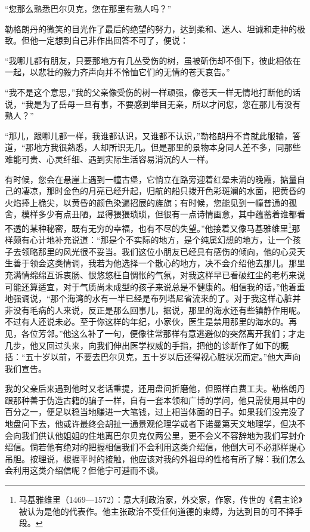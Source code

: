 \par “您那么熟悉巴尔贝克，您在那里有熟人吗？”
\par 勒格朗丹的微笑的目光作了最后的绝望的努力，达到柔和、迷人、坦诚和走神的极致。但他一定想到自己非作出回答不可了，便说：
\par “我哪儿都有朋友，只要那地方有几丛受伤的树，虽被斫伤却不倒下，彼此相依在一起，以悲壮的毅力齐声向并不怜恤它们的无情的苍天哀告。”
\par “我不是这个意思，”我的父亲像受伤的树一样顽强，像苍天一样无情地打断他的话说，“我是为了岳母一旦有事，不要感到举目无亲，所以才问您，您在那儿有没有熟人？”
\par “那儿，跟哪儿都一样，我谁都认识，又谁都不认识，”勒格朗丹不肯就此服输，答道，“那地方我很熟悉，人却所识无几。但是那里的景物本身同人差不多，同那些难能可贵、心灵纤细、遇到实际生活容易消沉的人一样。
\par 有时候，您会在悬崖上遇到一幢古堡，它悄立在路旁迎着红晕未消的晚霞，掂量自己的凄凉，那时金色的月亮已经升起，归航的船只拨开色彩斑斓的水面，把黄昏的火焰捧上桅尖，以黄昏的颜色染遍招展的旌旗；有时候，您能见到一幢普通的孤舍，模样多少有点丑陋，显得猥猥琐琐，但很有一点诗情画意，其中蕴蓄着谁都看不透的某种秘密，既有无穷的幸福，也有不尽的失望。”他接着又像马基雅维里\footnote{马基雅维里（1469—1572）：意大利政治家，外交家，作家，传世的《君主论》被认为是他的代表作。他主张政治不受任何道德的束缚，为达到目的可不择手段。}那样颇有心计地补充说道：“那是个不实际的地方，是个纯属幻想的地方，让一个孩子去领略那里的风光很不妥当。我们这位小朋友已经具有感伤的倾向，他的心灵天生善于领会这类情调，我若为他选择一个散心的地方，决不会介绍他去那儿。那里充满情绵绵互诉衷肠、恨悠悠枉自惆怅的气氛，对我这样早已看破红尘的老朽来说可能还算适宜，对于气质尚未成型的孩子来说总是不健康的。相信我的话，”他着重地强调说，“那个海湾的水有一半已经是布列塔尼省流来的了。对于我这样心脏并非没有毛病的人来说，反正是那么回事儿，据说，那里的海水还有些镇静作用呢。不过有人还说未必。至于你这样的年纪，小家伙，医生是禁用那里的海水的。再见，各位芳邻。”他这么补了一句，便像往常那样有意逃避似的突然离开我们；才走几步，他又回过头来，向我们伸出医学权威的手指，把他的诊断作了如下的概括：“五十岁以前，不要去巴尔贝克，五十岁以后还得视心脏状况而定。”他大声向我们宣告。
\par 我的父亲后来遇到他时又老话重提，还用盘问折磨他，但照样白费工夫。勒格朗丹跟那种善于伪造古籍的骗子一样，自有一套本领和广博的学问，他只需使用其中的百分之一，便足以稳当地赚进一大笔钱，过上相当体面的日子。如果我们没完没了地盘问下去，他或许最终会胡扯一通景观伦理学或者下诺曼第天文地理学，但决不会向我们供认他姐姐的住地离巴尔贝克仅两公里，更不会义不容辞地为我们写封介绍信。倘若他有绝对的把握相信我们不会利用这类介绍信，他倒大可不必那样提心吊胆。按理说，根据平时的接触，他应该对我的外祖母的性格有所了解：我们怎么会利用这类介绍信呢？但他宁可避而不谈。
